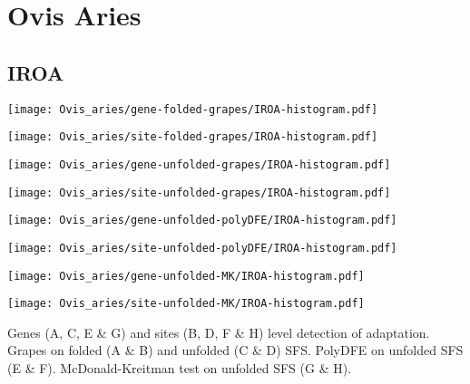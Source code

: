 \documentclass{article}
\begin{document}
\pagebreak
\section{Ovis Aries}

\subsection{IROA}
\centering
\begin{minipage}{0.49\linewidth}
    \texttt{[image: Ovis\_aries/gene-folded-grapes/IROA-histogram.pdf]}
\end{minipage}%
\hfill
\begin{minipage}{0.49\linewidth}
    \texttt{[image: Ovis\_aries/site-folded-grapes/IROA-histogram.pdf]}
\end{minipage}
\hfill
\begin{minipage}{0.49\linewidth}
    \texttt{[image: Ovis\_aries/gene-unfolded-grapes/IROA-histogram.pdf]}
\end{minipage}%
\hfill
\begin{minipage}{0.49\linewidth}
    \texttt{[image: Ovis\_aries/site-unfolded-grapes/IROA-histogram.pdf]}
\end{minipage}
\hfill
\begin{minipage}{0.49\linewidth}
    \texttt{[image: Ovis\_aries/gene-unfolded-polyDFE/IROA-histogram.pdf]}
\end{minipage}%
\hfill
\begin{minipage}{0.49\linewidth}
    \texttt{[image: Ovis\_aries/site-unfolded-polyDFE/IROA-histogram.pdf]}
\end{minipage}
\hfill
\begin{minipage}{0.49\linewidth}
    \texttt{[image: Ovis\_aries/gene-unfolded-MK/IROA-histogram.pdf]}
\end{minipage}%
\hfill
\begin{minipage}{0.49\linewidth}
    \texttt{[image: Ovis\_aries/site-unfolded-MK/IROA-histogram.pdf]}
\end{minipage}
\hfill
\flushleft
Genes (A, C, E \& G) and sites (B, D, F \& H) level detection of adaptation.
Grapes on folded (A \& B) and unfolded (C \& D) SFS.
PolyDFE on unfolded SFS (E \& F).
McDonald-Kreitman test on unfolded SFS (G \& H).
\end{document}
